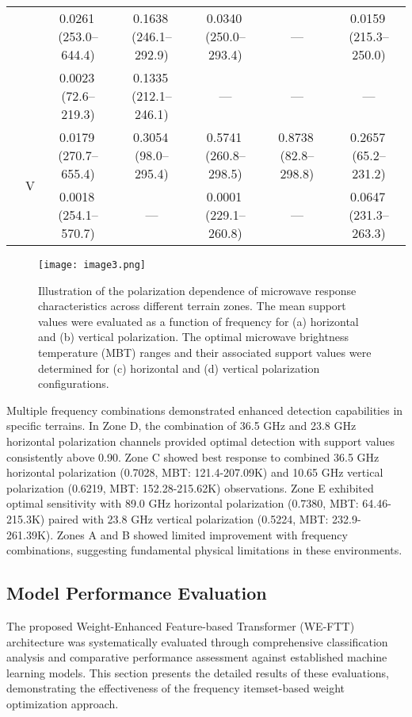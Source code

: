 \documentclass[fleqn,10pt]{wlscirep_mdpi_style}
\begin{document}
\begin{table}[!htbp]
{\begin{tabular}{@{}llccccc@{}}
    &   & 0.0261\,(253.0--644.4) & 0.1638\,(246.1--292.9) & 0.0340\,(250.0--293.4) & ---                   & 0.0159\,(215.3--250.0) \\
    &   & 0.0023\,(72.6--219.3)  & 0.1335\,(212.1--246.1) & ---                   & ---                   & ---\\[6pt]
    & \multirow{2}{*}{V} 
        & 0.0179\,(270.7--655.4) & 0.3054\,(98.0--295.4)  & 0.5741\,(260.8--298.5) & 0.8738\,(82.8--298.8)  & 0.2657\,(65.2--231.2)  \\
    &   & 0.0018\,(254.1--570.7) & ---                   & 0.0001\,(229.1--260.8) & ---                   & 0.0647\,(231.3--263.3) \\
\bottomrule
\end{tabular}
} %
\end{table}


\begin{figure}[!htbp]
\centering
\texttt{[image: image3.png]}
\caption{Illustration of the polarization dependence of microwave response characteristics across different terrain zones. The mean support values were evaluated as a function of frequency for (a) horizontal and (b) vertical polarization. The optimal microwave brightness temperature (MBT) ranges and their associated support values were determined for (c) horizontal and (d) vertical polarization configurations.}
\label{fig:fig3}
\end{figure}

Multiple frequency combinations demonstrated enhanced detection capabilities in specific terrains. In Zone D, the combination of 36.5 GHz and 23.8 GHz horizontal polarization channels provided optimal detection with support values consistently above 0.90. Zone C showed best response to combined 36.5 GHz horizontal polarization (0.7028, MBT: 121.4-207.09K) and 10.65 GHz vertical polarization (0.6219, MBT: 152.28-215.62K) observations. Zone E exhibited optimal sensitivity with 89.0 GHz horizontal polarization (0.7380, MBT: 64.46-215.3K) paired with 23.8 GHz vertical polarization (0.5224, MBT: 232.9-261.39K). Zones A and B showed limited improvement with frequency combinations, suggesting fundamental physical limitations in these environments.


\subsection{Model Performance Evaluation}
The proposed Weight-Enhanced Feature-based Transformer (WE-FTT) architecture was systematically evaluated through comprehensive classification analysis and comparative performance assessment against established machine learning models. This section presents the detailed results of these evaluations, demonstrating the effectiveness of the frequency itemset-based weight optimization approach.
\end{document}
